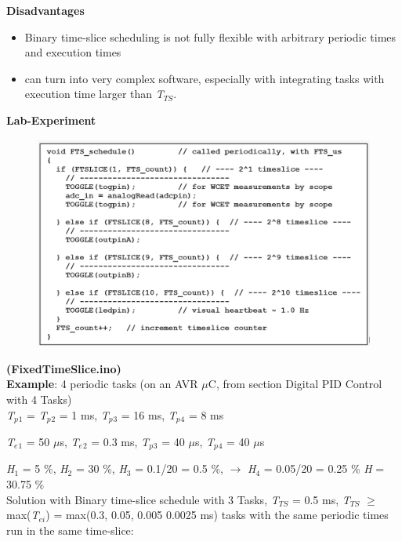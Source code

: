 \textbf{Disadvantages }

\begin{itemize}
	\item \textbf{ }Binary time-slice scheduling is not fully flexible with arbitrary periodic times and execution times
	\item  can turn into very complex software, especially with integrating tasks with execution time larger than \textit{T${}_{TS}$}.
\end{itemize}
\os{\newpage}
\textbf{Lab-Experiment}   \textbf{}

	\begin{figure}[h]
    \centering
    \includegraphics[width=13cm, height=7cm]{Images/image95.png}
    \label{fig:Fig 40}
    \end{figure}

\textbf{  (FixedTimeSlice.ino)}\\
\newpage
\textbf{Example}: 4 periodic tasks (on an AVR $\mu$C, from section Digital PID Control with 4 Tasks) \\

\textit{T${}_{p}$}${}_{1}$ = \textit{T${}_{p}$}${}_{2}$ = 1 ms, \textit{T${}_{p}$}${}_{3}$ = 16 ms, \textit{T${}_{p}$}${}_{4}$ = 8 ms

\textit{T${}_{e}$}${}_{1}$ = 50 $\mu$s, \textit{T${}_{e}$}${}_{2}$ = 0.3 ms, \textit{T${}_{p}$}${}_{3}$ = 40 $\mu$s, \textit{T${}_{p}$}${}_{4}$ = 40 $\mu$s

\textit{H}${}_{1}$ = 5 \%, \textit{H}${}_{2}$ = 30 \%, \textit{H}${}_{3}$ = 0.1/20 = 0.5 \%, $\rightarrow$ \textit{H}${}_{4}$ = 0.05/20 = 0.25 \%  \textit{H} = 30.75 \%\\

Solution with Binary time-slice schedule with 3 Tasks, \textit{T${}_{TS}$} = 0.5 ms, \textit{T${}_{TS}$} $\mathrm{\ge}$ max(\textit{T${}_{ei}$}) = max(0.3, 0.05, 0.005 0.0025 ms) tasks with the same periodic times run in the same time-slice:\\

